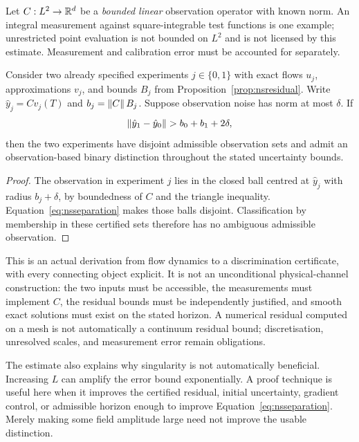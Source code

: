 Let $C:L^2\to\mathbb{R}^d$ be a \emph{bounded linear} observation operator with known norm. An integral measurement against square-integrable test functions is one example; unrestricted point evaluation is not bounded on $L^2$ and is not licensed by this estimate. Measurement and calibration error must be accounted for separately.

\begin{corollary}\label{cor:nsobservation}
Consider two already specified experiments $j\in\{0,1\}$ with exact flows $u_j$, approximations $v_j$, and bounds $B_j$ from Proposition~\ref{prop:nsresidual}. Write $\hat y_j=Cv_j(T)$ and $b_j=\left\lVert C\right\rVert B_j$. Suppose observation noise has norm at most $\delta$. If
\begin{equation}\label{eq:nsseparation}
 \left\lVert\hat y_1-\hat y_0\right\rVert>b_0+b_1+2\delta,
\end{equation}
then the two experiments have disjoint admissible observation sets and admit an observation-based binary distinction throughout the stated uncertainty bounds.
\end{corollary}
\begin{proof}
The observation in experiment $j$ lies in the closed ball centred at $\hat y_j$ with radius $b_j+\delta$, by boundedness of $C$ and the triangle inequality. Equation~\eqref{eq:nsseparation} makes those balls disjoint. Classification by membership in these certified sets therefore has no ambiguous admissible observation.
\end{proof}

This is an actual derivation from flow dynamics to a discrimination certificate, with every connecting object explicit. It is not an unconditional physical-channel construction: the two inputs must be accessible, the measurements must implement $C$, the residual bounds must be independently justified, and smooth exact solutions must exist on the stated horizon. A numerical residual computed on a mesh is not automatically a continuum residual bound; discretisation, unresolved scales, and measurement error remain obligations.

The estimate also explains why singularity is not automatically beneficial. Increasing $L$ can amplify the error bound exponentially. A proof technique is useful here when it improves the certified residual, initial uncertainty, gradient control, or admissible horizon enough to improve Equation~\eqref{eq:nsseparation}. Merely making some field amplitude large need not improve the usable distinction.

